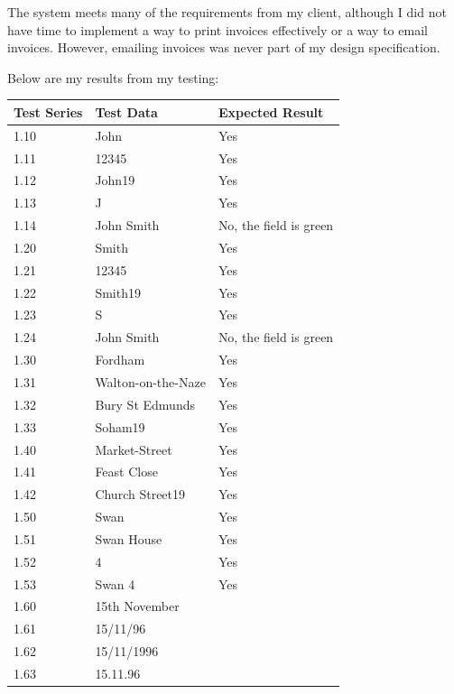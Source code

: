 The system meets many of the requirements from my client, although I did not have time to implement a way to print invoices effectively or a way to email invoices. However, emailing invoices was never part of my design specification.

Below are my results from my testing:

\begin{center}
    \begin{longtable}{|p{2cm}|p{5cm}|p{8cm}|}
        \hline
        \textbf{Test Series} & \textbf{Test Data} & \textbf{Expected Result}\\ \hline
        1.10 & John & Yes \\ \hline
        1.11 & 12345 & Yes \\ \hline
        1.12 & John19 & Yes \\ \hline
        1.13 & J & Yes \\ \hline
        1.14 & John Smith & No, the field is green \\ \hline
        
        1.20 & Smith & Yes \\ \hline
        1.21 & 12345 &  Yes \\ \hline
        1.22 & Smith19 & Yes \\ \hline
        1.23 & S & Yes \\ \hline
        1.24 & John Smith & No, the field is green \\ \hline
        
        1.30 & Fordham & Yes  \\ \hline
        1.31 & Walton-on-the-Naze & Yes \\ \hline
        1.32 & Bury St Edmunds & Yes \\ \hline
        1.33 & Soham19 & Yes \\ \hline

        1.40 & Market-Street & Yes \\ \hline
        1.41 & Feast Close & Yes \\ \hline
        1.42 & Church Street19 & Yes \\ \hline
        
        1.50 & Swan & Yes \\ \hline
        1.51 & Swan House & Yes \\ \hline
        1.52 & 4 & Yes \\ \hline
        1.53 & Swan 4 & Yes \\ \hline
        
        \rowcolor{darkgrey} 1.60 & 15th November &  \\ \hline
        \rowcolor{darkgrey} 1.61 & 15/11/96 & \\ \hline
        \rowcolor{darkgrey} 1.62 & 15/11/1996 &  \\ \hline
        \rowcolor{darkgrey} 1.63 & 15.11.96 & \\ \hline
        

\end{longtable}
\end{center}
